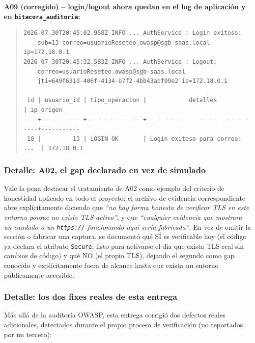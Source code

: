 \documentclass[12pt,a4paper]{article}
\begin{document}
\textbf{A09 (corregido) -- login/logout ahora quedan en el log de
aplicación y en \texttt{bitacora\_auditoria}:}
\begin{quote}\small
\begin{verbatim}
2026-07-30T20:45:02.958Z INFO ... AuthService : Login exitoso:
    sub=13 correo=usuarioReseteo.owasp@sgb-saas.local ip=172.18.0.1
2026-07-30T20:45:32.583Z INFO ... AuthService : Logout:
    correo=usuarioReseteo.owasp@sgb-saas.local
    jti=649f631d-406f-4134-b7f2-4bb43abf09e2 ip=172.18.0.1

 id | usuario_id | tipo_operacion |            detalles            | ip_origen
----+------------+----------------+---------------------------------+-----------
 10 |         13 | LOGIN_OK       | Login exitoso para correo: ...  | 172.18.0.1
\end{verbatim}
\end{quote}

\subsubsection*{Detalle: A02, el gap declarado en vez de simulado}

Vale la pena destacar el tratamiento de A02 como ejemplo del criterio de
honestidad aplicado en todo el proyecto: el archivo de evidencia
correspondiente abre explícitamente diciendo que \emph{``no hay forma
honesta de verificar TLS en este entorno porque no existe TLS
activo''}, y que \emph{``cualquier evidencia que mostrara un candado o
un \texttt{https://} funcionando aquí sería fabricada''}. En vez de
omitir la sección o fabricar una captura, se documentó qué SÍ es
verificable hoy (el código ya declara el atributo \texttt{Secure}, listo
para activarse el día que exista TLS real sin cambios de código) y qué
NO (el propio TLS), dejando el segundo como gap conocido y explícitamente
fuera de alcance hasta que exista un entorno públicamente accesible.

\subsubsection*{Detalle: los dos fixes reales de esta entrega}

Más allá de la auditoría OWASP, esta entrega corrigió dos defectos reales
adicionales, detectados durante el propio proceso de verificación (no
reportados por un tercero):
\end{document}
